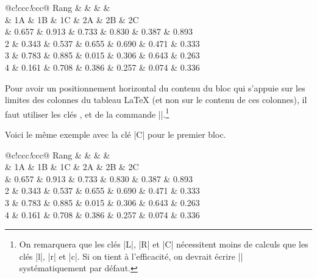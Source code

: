 \documentclass[dvipsnames]{article}
\begin{document}
\medskip

\begin{Code}
\begin{NiceTabular}{@{}c!{\qquad}ccc\emph{!{\qquad}}ccc@{}}
\toprule
Rang & \emph{} & & &  \\
     & 1A & 1B & 1C & 2A & 2B & 2C \\
 & 0.657 & 0.913 & 0.733 & 0.830 & 0.387 & 0.893\\
 2 & 0.343 & 0.537 & 0.655 & 0.690 & 0.471 & 0.333\\
 3 & 0.783 & 0.885 & 0.015 & 0.306 & 0.643 & 0.263\\
 4 & 0.161 & 0.708 & 0.386 & 0.257 & 0.074 & 0.336\\
\bottomrule
\end{NiceTabular}
\end{Code}


\medskip
Pour avoir un positionnement horizontal du contenu du bloc qui s'appuie sur les
limites des colonnes du tableau LaTeX (et non sur le contenu de ces colonnes),
il faut utiliser les clés ,  et  de la
commande |\Block|.\footnote{On remarquera que les clés |L|, |R| et |C|
  nécessitent moins de calculs que les clés |l|, |r| et |c|. Si on tient à
  l'efficacité, on devrait écrire |\Block[C]| systématiquement par défaut.}

\medskip
\clearpage
Voici le même exemple avec la clé |C| pour le premier bloc.


\begin{Code}
\begin{NiceTabular}{@{}c!{\qquad}ccc\emph{!{\qquad}}ccc@{}}
\toprule
Rang & \emph{} & & &  \\
     & 1A & 1B & 1C & 2A & 2B & 2C \\
 & 0.657 & 0.913 & 0.733 & 0.830 & 0.387 & 0.893\\
 2 & 0.343 & 0.537 & 0.655 & 0.690 & 0.471 & 0.333\\
 3 & 0.783 & 0.885 & 0.015 & 0.306 & 0.643 & 0.263\\
 4 & 0.161 & 0.708 & 0.386 & 0.257 & 0.074 & 0.336\\
\bottomrule
\end{NiceTabular}
\end{Code}
\end{document}
